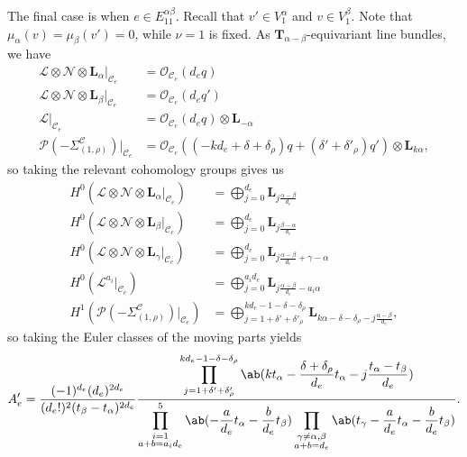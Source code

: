 \documentclass{amsart}
\theoremstyle{definition}
\theoremstyle{remark}
\theoremstyle{plain}
\theoremstyle{definition}
\theoremstyle{remark}
\newcommand{\T}{\mathbf{T}}
\newcommand{\mc}[1]{\mathcal{#1}}
\newcommand{\mbf}[1]{\mathbf{#1}}
\newcommand{\1}{\mathbf{1}}
\newcommand{\2}{\mathbf{2}}
\newcommand{\3}{\mathbf{3}}
\begin{document}
The final case is when $e \in E_{11}^{\alpha\beta}$. Recall that $v' \in V_1^{\alpha}$ and $v \in V_1^{\beta}$. Note that $\mu_{\alpha}(v) = \mu_{\beta}(v') = 0$, while $\nu = 1$ is fixed. As $\T_{\alpha-\beta}$-equivariant line bundles, we have
\begin{align*}
    \mc{L} \otimes \mc{N} \otimes \mbf{L}_{\alpha} |_{\mc{C}_e} &= \mc{O}_{\mc{C}_e}(d_e q) \\
    \mc{L} \otimes \mc{N} \otimes \mbf{L}_{\beta} |_{\mc{C}_e} &= \mc{O}_{\mc{C}_e}(d_e q') \\
    \mc{L} |_{\mc{C}_e} &= \mc{O}_{\mc{C}_e}(d_e q) \otimes \mbf{L}_{-\alpha} \\
    \mc{P}(-\Sigma_{(1,\rho)}^{\mc{C}}) |_{\mc{C}_e} &= \mc{O}_{\mc{C}_e}(( -k d_e +\delta + \delta_{\rho} )q + (\delta' + \delta'_{\rho})q') \otimes \mbf{L}_{k\alpha},
\end{align*}
so taking the relevant cohomology groups gives us
\begin{align*}
    H^0(\mc{L}\otimes\mc{N}\otimes\mbf{L}_{\alpha}|_{\mc{C}_e}) &= \bigoplus_{j=0}^{d_e} \mbf{L}_{j\frac{\alpha-\beta}{d_e}} \\
    H^0(\mc{L}\otimes\mc{N}\otimes\mbf{L}_{\beta}|_{\mc{C}_e}) &= \bigoplus_{j=0}^{d_e} \mbf{L}_{j\frac{\beta-\alpha}{d_e}} \\
    H^0(\mc{L}\otimes\mc{N}\otimes\mbf{L}_{\gamma}|_{\mc{C}_e}) &= \bigoplus_{j=0}^{d_e} \mbf{L}_{j\frac{\alpha-\beta}{d_e} + \gamma-\alpha} \\
    H^0(\mc{L}^{a_i}|_{\mc{C}_e}) &= \bigoplus_{j=0}^{a_i d_e} \mbf{L}_{j\frac{\alpha-\beta}{d_e} -a_i \alpha} \\
    H^1(\mc{P}(-\Sigma_{(1,\rho)}^{\mc{C}})|_{\mc{C}_e}) &= \bigoplus_{j=1+\delta'+\delta'_{\rho}}^{k d_e - 1 - \delta - \delta_{\rho}} \mbf{L}_{k \alpha -  \delta -\delta_{\rho}  - j\frac{\alpha-\beta}{d_e}},
\end{align*}
so taking the Euler classes of the moving parts yields
\[ A_e' =  \frac{(-1)^{d_e}(d_e)^{2 d_e}}{(d_e!)^2 (t_{\beta}-t_{\alpha})^{2d_e}} \frac{\displaystyle\prod_{j=1+\delta'+\delta'_{\rho}}^{k d_e - 1 - \delta - \delta_{\rho}}\ab(k t_{\alpha} - \frac{\delta+\delta_{\rho}}{d_e} t_{\alpha} - j \frac{t_{\alpha}-t_{\beta}}{d_e})}{\displaystyle\prod_{\substack{i=1 \\ a+b = a_i d_e}}^5  \ab(-\frac{a}{d_e} t_{\alpha} - \frac{b}{d_e} t_{\beta}) \prod_{\substack{ \gamma \neq \alpha,\beta \\ a+b = d_e }}  \ab(t_{\gamma} - \frac{a}{d_e} t_{\alpha} - \frac{b}{d_e} t_{\beta})}. \]
\end{document}
